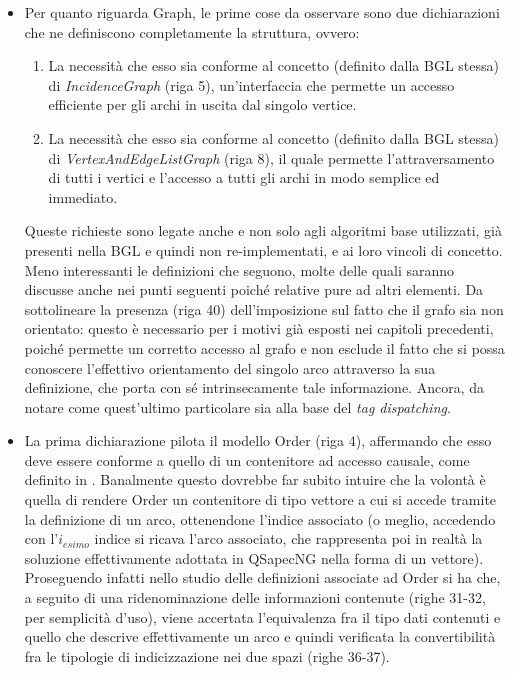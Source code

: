 \begin{itemize}
 \item Per quanto riguarda Graph, le prime cose da osservare sono due dichiarazioni che ne definiscono completamente la struttura, ovvero:
   \begin{enumerate}
    \item La necessità che esso sia conforme al concetto (definito dalla BGL stessa) di \textit{IncidenceGraph} (riga 5), un'interfaccia che permette un accesso efficiente per gli archi in uscita dal singolo vertice.
    \item La necessità che esso sia conforme al concetto (definito dalla BGL stessa) di \textit{VertexAndEdgeListGraph} (riga 8), il quale permette l'attraversamento di tutti i vertici e l'accesso a tutti gli archi in modo semplice ed immediato.
   \end{enumerate}
 Queste richieste sono legate anche e non solo agli algoritmi base utilizzati, già presenti nella BGL e quindi non re-implementati, e ai loro vincoli di concetto. Meno interessanti le definizioni che seguono, molte delle quali saranno discusse anche nei punti seguenti poiché relative pure ad altri elementi. Da sottolineare la presenza (riga 40) dell'imposizione sul fatto che il grafo sia non orientato: questo è necessario per i motivi già esposti nei capitoli precedenti, poiché permette un corretto accesso al grafo e non esclude il fatto che si possa conoscere l'effettivo orientamento del singolo arco attraverso la sua definizione, che porta con sé intrinsecamente tale informazione. Ancora, da notare come quest'ultimo particolare sia alla base del \textit{tag dispatching}.
 \item La prima dichiarazione pilota il modello Order (riga 4), affermando che esso deve essere conforme a quello di un contenitore ad accesso causale, come definito in \cite{STL}. Banalmente questo dovrebbe far subito intuire che la volontà è quella di rendere Order un contenitore di tipo vettore a cui si accede tramite la definizione di un arco, ottenendone l'indice associato (o meglio, accedendo con l'$i_{esimo}$ indice si ricava l'arco associato, che rappresenta poi in realtà la soluzione effettivamente adottata in QSapecNG nella forma di un vettore). Proseguendo infatti nello studio delle definizioni associate ad Order si ha che, a seguito di una ridenominazione delle informazioni contenute (righe 31-32, per semplicità d'uso), viene accertata l'equivalenza fra il tipo dati contenuti e quello che descrive effettivamente un arco e quindi verificata la convertibilità fra le tipologie di indicizzazione nei due spazi (righe 36-37).

\end{itemize}
